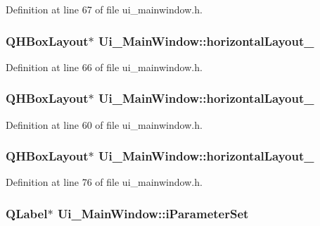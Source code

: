 \-Definition at line 67 of file ui\-\_\-mainwindow.\-h.

\hypertarget{class_ui___main_window_ae183387a7d233b437a637b403ba39ffd}{
\subsubsection[{horizontal\-Layout\-\_\-4}]{\setlength{\rightskip}{0pt plus 5cm}\-Q\-H\-Box\-Layout$\ast$ {\bf \-Ui\-\_\-\-Main\-Window\-::horizontal\-Layout\-\_}}}\label{class_ui___main_window_ae183387a7d233b437a637b403ba39ffd}


\-Definition at line 66 of file ui\-\_\-mainwindow.\-h.

\hypertarget{class_ui___main_window_a14c9d4842c3e97e16e7873ef0aecdb1e}{
\subsubsection[{horizontal\-Layout\-\_\-5}]{\setlength{\rightskip}{0pt plus 5cm}\-Q\-H\-Box\-Layout$\ast$ {\bf \-Ui\-\_\-\-Main\-Window\-::horizontal\-Layout\-\_}}}\label{class_ui___main_window_a14c9d4842c3e97e16e7873ef0aecdb1e}


\-Definition at line 60 of file ui\-\_\-mainwindow.\-h.

\hypertarget{class_ui___main_window_a1351e317cba7ca711b6b4d2212b6bf36}{
\subsubsection[{horizontal\-Layout\-\_\-6}]{\setlength{\rightskip}{0pt plus 5cm}\-Q\-H\-Box\-Layout$\ast$ {\bf \-Ui\-\_\-\-Main\-Window\-::horizontal\-Layout\-\_}}}\label{class_ui___main_window_a1351e317cba7ca711b6b4d2212b6bf36}


\-Definition at line 76 of file ui\-\_\-mainwindow.\-h.

\hypertarget{class_ui___main_window_a4f1de3b858235bda33821eb68eb5a15b}{
\subsubsection[{i\-Parameter\-Set}]{\setlength{\rightskip}{0pt plus 5cm}\-Q\-Label$\ast$ {\bf \-Ui\-\_\-\-Main\-Window\-::i\-Parameter\-Set}}}\label{class_ui___main_window_a4f1de3b858235bda33821eb68eb5a15b}


